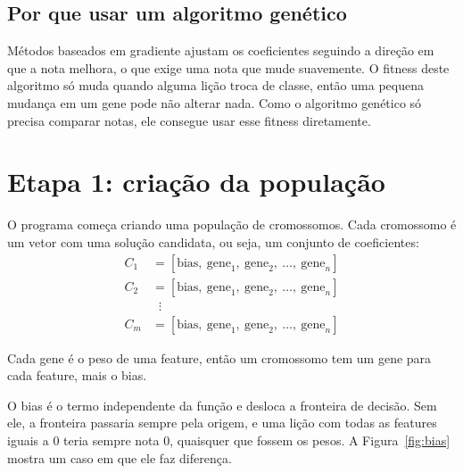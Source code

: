 \documentclass[11pt,a4paper]{article}
\begin{document}
\subsection{Por que usar um algoritmo genético}

Métodos baseados em gradiente ajustam os coeficientes seguindo a direção em que a nota melhora, o que exige uma nota que mude suavemente. O fitness deste algoritmo só muda quando alguma lição troca de classe, então uma pequena mudança em um gene pode não alterar nada. Como o algoritmo genético só precisa comparar notas, ele consegue usar esse fitness diretamente.

\clearpage
\section{Etapa 1: criação da população}

O programa começa criando uma população de cromossomos. Cada cromossomo é um vetor com uma solução candidata, ou seja, um conjunto de coeficientes:
\begin{align*}
  C_1 &= [\text{bias},\ \text{gene}_1,\ \text{gene}_2,\ \dots,\ \text{gene}_n]\\
  C_2 &= [\text{bias},\ \text{gene}_1,\ \text{gene}_2,\ \dots,\ \text{gene}_n]\\
  &\;\;\vdots\\
  C_m &= [\text{bias},\ \text{gene}_1,\ \text{gene}_2,\ \dots,\ \text{gene}_n]
\end{align*}

Cada gene é o peso de uma feature, então um cromossomo tem um gene para cada feature, mais o bias.

O bias é o termo independente da função e desloca a fronteira de decisão. Sem ele, a fronteira passaria sempre pela origem, e uma lição com todas as features iguais a 0 teria sempre nota 0, quaisquer que fossem os pesos. A Figura~\ref{fig:bias} mostra um caso em que ele faz diferença.
\end{document}
